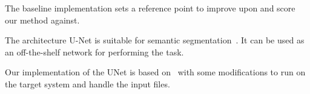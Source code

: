 The baseline implementation sets a reference point to improve upon and score our method against.

The architecture U-Net is suitable for semantic segmentation~\cite{RonnebergerFB15}.
It can be used as an off-the-shelf network for performing the task.

Our implementation of the UNet is based on~\cite{GH-Pytorch-UNet2018} with some modifications to run on the target system and handle the input files.
